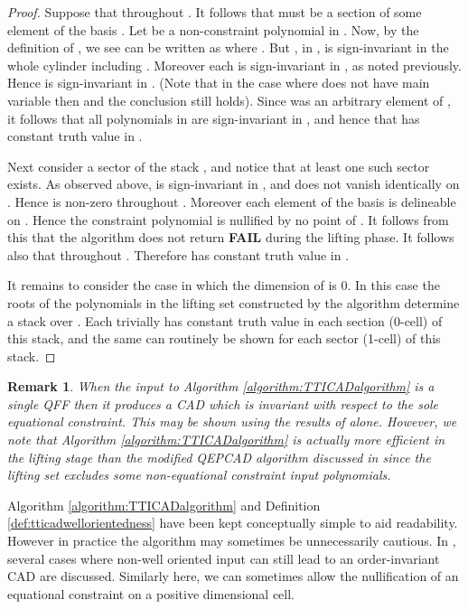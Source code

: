 \documentclass{article}
\newtheorem{remark}[theorem]{Remark}
\begin{document}
\begin{proof}
Suppose that  throughout .
It follows that  must be a section of some element of the basis .
Let  be a non-constraint polynomial in .
Now, by the definition of , we see  can be written as 
 where . 
But , in ,
is sign-invariant in the whole cylinder  including .
Moreover each  is sign-invariant in , as noted previously.
Hence  is sign-invariant in .  (Note that in the case where  does not have main variable  then  and the conclusion still holds).
Since  was an arbitrary element of ,
it follows that all polynomials in  are sign-invariant in ,
and hence that  has constant truth value in .

Next consider a sector  of the stack , and notice that
at least one such sector exists.
As observed above,  is sign-invariant in ,
and  does not vanish identically on .
Hence  is non-zero throughout . Moreover
each element of the basis  is delineable on .
Hence the constraint polynomial  is nullified by no point of .
It follows from this that the algorithm does not return \textbf{FAIL}
during the lifting phase.
It follows also that  throughout .
Therefore  has constant truth value  in .

It remains to consider the case in which the dimension of  is 0.
In this case the roots of the polynomials in the lifting set  constructed
by the algorithm determine a stack  over .
Each  trivially has constant truth
value in each section (0-cell) of this stack,
and the same can routinely be shown for each sector (1-cell) of this stack.
\end{proof}

\begin{remark}
When the input to Algorithm \ref{algorithm:TTICADalgorithm} is a single QFF then it produces a CAD which is invariant with respect to the sole equational constraint.  This may be shown using the results of \cite{McCallum1999a} alone.  However, we note that  Algorithm \ref{algorithm:TTICADalgorithm} is actually more efficient in the lifting stage than the modified QEPCAD algorithm discussed in \cite{McCallum1999a} since the lifting set excludes some non-equational constraint input polynomials.
\end{remark} 

Algorithm \ref{algorithm:TTICADalgorithm} and Definition \ref{def:tticadwellorientedness} have been kept conceptually simple to aid readability. However in practice the algorithm may sometimes be unnecessarily cautious.  
In \cite{Brown2005}, several cases where non-well oriented input can still lead to an order-invariant CAD are discussed. Similarly here, we can sometimes allow the nullification of an equational constraint on a positive dimensional cell.
\end{document}
